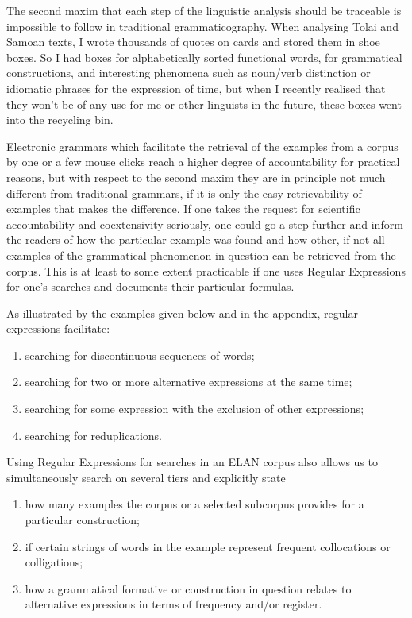 The second maxim that each step of the linguistic analysis should be traceable is impossible to follow in traditional grammaticography. When analysing Tolai and Samoan texts, I wrote thousands of quotes on cards and stored them in shoe boxes. So I had boxes for alphabetically sorted functional words, for grammatical constructions, and interesting phenomena such as noun/verb distinction or idiomatic phrases for the expression of time, but when I recently realised that they won't be of any use for me or other linguists in the future, these boxes went into the recycling bin.  


Electronic grammars which facilitate the retrieval of the examples from a corpus by one or a few mouse clicks reach a higher degree of accountability for practical reasons, but with respect to the second maxim they are in principle not much different from traditional grammars, if it is only the easy retrievability of examples that makes the difference. If one takes the request for scientific accountability and coextensivity seriously, one could go a step further and inform the readers of how the particular example was found and how other, if not all examples of the grammatical phenomenon in question can be retrieved from the corpus. This is at least to some extent practicable if one uses Regular Expressions for one's searches and documents their particular formulas. 


As illustrated by the examples given below and in the appendix, regular expressions facilitate:

\begin{enumerate}
\item {searching for discontinuous sequences of words;}
\item {searching for two or more alternative expressions at the same time;}
\item {searching for some expression with the exclusion of other expressions;}
\item {searching for reduplications.}
\end{enumerate}

Using Regular Expressions for searches in an ELAN corpus also allows us to simultaneously search on several tiers and explicitly state

\begin{enumerate}
\item {how many examples the corpus or a selected subcorpus provides for a particular construction;}
\item {if certain strings of words in the example represent frequent collocations or colligations;}
\item {how a grammatical formative or construction in question relates to alternative expressions in terms of frequency and/or register.}
\end{enumerate}

